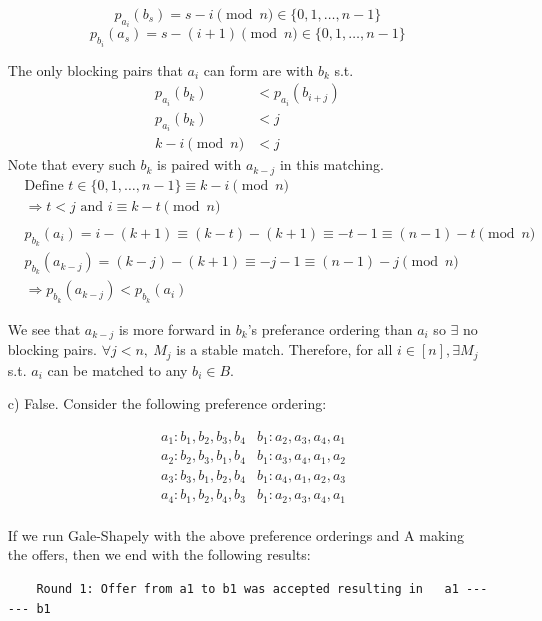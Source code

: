 \documentclass[12pt]{article}
\begin{document}
\begin{itemize}
    \[p_{a_i}(b_s) = s - i \pmod{n}\in \{0, 1, \dots, n-1\}\]
    \[p_{b_i}(a_s) = s - (i + 1) \pmod{n}\in \{0, 1, \dots, n-1\}\]
    
    The only blocking pairs that $a_i$ can form are with $b_k$ s.t.
    \begin{align*}
        p_{a_i}(b_k) &< p_{a_i}(b_{i+j}) \\
        p_{a_i}(b_k) &< j \\
        k-i \pmod{n} &< j
    \end{align*}
    Note that every such $b_k$ is paired with $a_{k-j}$ in this matching. 
    \begin{align*}
        &\text{Define } t \in \{0,1, \dots, n-1 \} \equiv k-i \pmod{n} \\
        & \Rightarrow t < j \text{ and } i \equiv k - t \pmod{n}\\ \\
        &p_{b_k}(a_{i}) = i - (k + 1) \equiv (k-t)-(k+1) \equiv -t-1 \equiv (n-1)-t\pmod{n} \\
        &p_{b_k}(a_{k-j}) = (k-j) - (k + 1) \equiv -j - 1 \equiv (n-1)-j \pmod{n}\\
        & \Rightarrow p_{b_k}(a_{k-j}) < p_{b_k}(a_{i})
    \end{align*}

    We see that $a_{k-j}$ is more forward in $b_k$'s preferance ordering than $a_i$ so
    $\exists$ no blocking pairs. $\forall j < n, ~M_j$ is a stable match. Therefore, for all $i \in [n], \exists M_j$ s.t. $a_i$ can be matched to any $b_i \in B$.

    \item[c)] False. Consider the following preference ordering:

    \begin{align*}
        &a_1: b_1, b_2, b_3, b_4    &b_1: a_2, a_3, a_4, a_1\\
        &a_2: b_2, b_3, b_1, b_4    &b_1: a_3, a_4, a_1, a_2\\
        &a_3: b_3, b_1, b_2, b_4    &b_1: a_4, a_1, a_2, a_3\\
        &a_4: b_1, b_2, b_4, b_3    &b_1: a_2, a_3, a_4, a_1\\
    \end{align*}

    If we run Gale-Shapely with the above preference orderings and A making the offers, then we end with the following results:

    \begin{verbatim}
    Round 1: Offer from a1 to b1 was accepted resulting in   a1 ------ b1


\end{verbatim}
\end{itemize}
\end{document}
